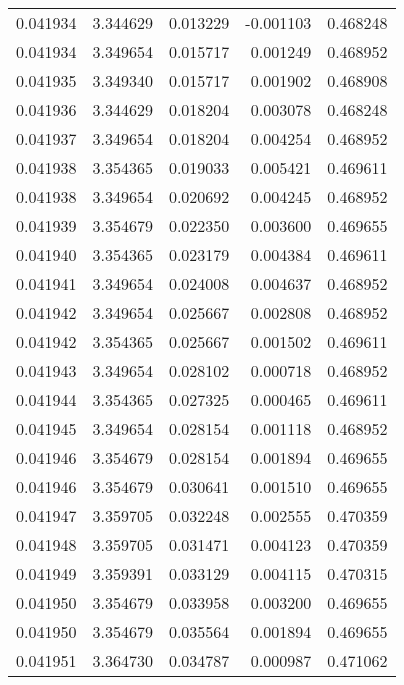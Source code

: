 \begin{tabular}{lrrrr}
0.041934    &  3.344629 &  0.013229 & -0.001103 &             0.468248 \\
0.041934    &  3.349654 &  0.015717 &  0.001249 &             0.468952 \\
0.041935    &  3.349340 &  0.015717 &  0.001902 &             0.468908 \\
0.041936    &  3.344629 &  0.018204 &  0.003078 &             0.468248 \\
0.041937    &  3.349654 &  0.018204 &  0.004254 &             0.468952 \\
0.041938    &  3.354365 &  0.019033 &  0.005421 &             0.469611 \\
0.041938    &  3.349654 &  0.020692 &  0.004245 &             0.468952 \\
0.041939    &  3.354679 &  0.022350 &  0.003600 &             0.469655 \\
0.041940    &  3.354365 &  0.023179 &  0.004384 &             0.469611 \\
0.041941    &  3.349654 &  0.024008 &  0.004637 &             0.468952 \\
0.041942    &  3.349654 &  0.025667 &  0.002808 &             0.468952 \\
0.041942    &  3.354365 &  0.025667 &  0.001502 &             0.469611 \\
0.041943    &  3.349654 &  0.028102 &  0.000718 &             0.468952 \\
0.041944    &  3.354365 &  0.027325 &  0.000465 &             0.469611 \\
0.041945    &  3.349654 &  0.028154 &  0.001118 &             0.468952 \\
0.041946    &  3.354679 &  0.028154 &  0.001894 &             0.469655 \\
0.041946    &  3.354679 &  0.030641 &  0.001510 &             0.469655 \\
0.041947    &  3.359705 &  0.032248 &  0.002555 &             0.470359 \\
0.041948    &  3.359705 &  0.031471 &  0.004123 &             0.470359 \\
0.041949    &  3.359391 &  0.033129 &  0.004115 &             0.470315 \\
0.041950    &  3.354679 &  0.033958 &  0.003200 &             0.469655 \\
0.041950    &  3.354679 &  0.035564 &  0.001894 &             0.469655 \\
0.041951    &  3.364730 &  0.034787 &  0.000987 &             0.471062 \\

\end{tabular}
